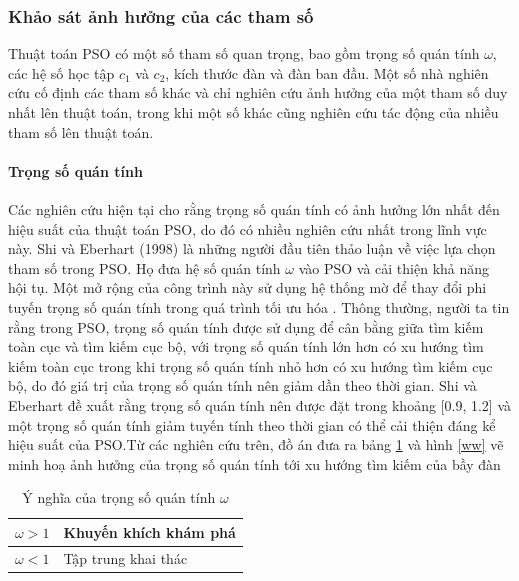 \documentclass{thesis}
\begin{document}
\subsubsection{Khảo sát ảnh hưởng của các tham số}
Thuật toán PSO có một số tham số quan trọng, bao gồm trọng số quán tính $\omega$, các hệ số học tập $c_1$ và $c_2$, kích thước đàn và đàn ban đầu. Một số nhà nghiên cứu cố định các tham số khác và chỉ nghiên cứu ảnh hưởng của một tham số duy nhất lên thuật toán, trong khi một số khác cũng nghiên cứu tác động của nhiều tham số lên thuật toán.
\paragraph{Trọng số quán tính}\mbox


Các nghiên cứu hiện tại cho rằng trọng số quán tính có ảnh hưởng lớn nhất đến hiệu suất của thuật toán PSO, do đó có nhiều nghiên cứu nhất trong lĩnh vực này. Shi và Eberhart (1998) \cite{shi1998modified} là những người đầu tiên thảo luận về việc lựa chọn tham số trong PSO. Họ đưa hệ số quán tính $\omega$ vào PSO và cải thiện khả năng hội tụ. Một mở rộng của công trình này sử dụng hệ thống mờ để thay đổi phi tuyến trọng số quán tính trong quá trình tối ưu hóa \cite{shi2001fuzzy}.
Thông thường, người ta tin rằng trong PSO, trọng số quán tính được sử dụng để cân bằng giữa tìm kiếm toàn cục và tìm kiếm cục bộ, với trọng số quán tính lớn hơn có xu hướng tìm kiếm toàn cục trong khi trọng số quán tính nhỏ hơn có xu hướng tìm kiếm cục bộ, do đó giá trị của trọng số quán tính nên giảm dần theo thời gian. Shi và Eberhart \cite{shi1998modified} đề xuất rằng trọng số quán tính nên được đặt trong khoảng [0.9, 1.2] và một trọng số quán tính giảm tuyến tính theo thời gian có thể cải thiện đáng kể hiệu suất của PSO.Từ các nghiên cứu trên, đồ án đưa ra bảng \ref{w} và hình \ref{ww} vẽ minh hoạ ảnh hưởng của trọng số quán tính tới xu hướng tìm kiếm của bầy đàn


\begin{table}[ht]
\caption{Ý nghĩa của trọng số quán tính $\omega$}
\centering
\renewcommand{\arraystretch}{1.5} %
\setlength{\tabcolsep}{20pt} %
\begin{tabular}{|>{\centering\arraybackslash}m{3cm}|>{\centering\arraybackslash}m{5cm}|}
\hline
$\omega > 1$ & Khuyến khích khám phá \\
\hline
$\omega < 1$ & Tập trung khai thác \\
\hline
\end{tabular}
\label{w}
\end{table}
\end{document}
